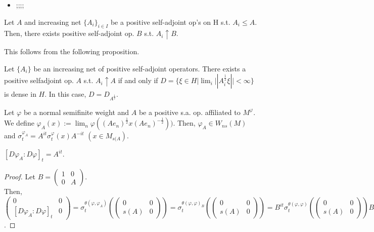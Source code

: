 \begin{remark}
  \begin{itemize}
    \item ;;;;
  \end{itemize}
\end{remark}

\begin{theorem}
  Let $A$ and increasing net $\{A_i\}_{i \in I}$ be a positive self-adjoint op's on H s.t. $A_i\leq A$.
  Then, there exists positive self-adjoint op. $B$ s.t. $A_i \uparrow B$.
\end{theorem}

This follows from the following proposition.

\begin{proposition}
  Let $\{A_i\}$ be an increasing net of positive self-adjoint operators.
  There exists a positive selfadjoint op. $A$ s.t. $A_i \uparrow A$ if and only if $D = \{ \xi \in H | \lim_i||A_i^{\frac{1}{2}}\xi|| < \infty \}$ is dense in $H$.
  In this case, $D = D_{A^{\frac{1}{2}}}$.
\end{proposition}

\begin{theorem}
  Let $\varphi$ be a normal semifinite weight and $A$ be a positive s.a. op. affiliated to $M^\varphi$.
  We define $\varphi_A(x) := \lim_n \varphi((Ae_n)^{\frac{1}{2}}x(Ae_n)^{-\frac{1}{2}}))$.
  Then, $\varphi_A \in W_{ns}(M)$ and $\sigma_t^{\varphi_A} = A^{it} \sigma_t^\varphi(x) A^{-it}$ $(x \in M_{s(A})$.
\end{theorem}

\begin{corollary}
  $[D\varphi_A:D\varphi]_t = A^{it}$.
\end{corollary}

\begin{proof}
  Let $B = \begin{pmatrix} 1 & 0 \\ 0 & A \end{pmatrix}$.\\
  Then, $\begin{pmatrix} 0 & 0 \\ [D\varphi_A:D\varphi]_t & 0 \end{pmatrix}
  = \sigma_t^{\theta(\varphi,\varphi_A)}(\begin{pmatrix} 0 & 0 \\ s(A) & 0 \end{pmatrix})
  = \sigma_t^{\theta(\varphi,\varphi)_B}(\begin{pmatrix} 0 & 0 \\ s(A) & 0 \end{pmatrix})
  = B^{it} \sigma_t^{\theta(\varphi,\varphi)}(\begin{pmatrix} 0 & 0 \\ s(A) & 0 \end{pmatrix}) B^{-it}$.
\end{proof}

